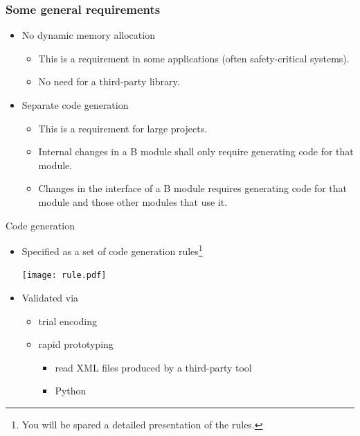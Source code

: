 \documentclass[12pt]{beamer}
\begin{document}
\begin{frame}

  \frametitle{Some general requirements}
	
  \begin{itemize}
  \item No dynamic memory allocation
    \begin{itemize}
    \item This is a requirement in some applications (often
      safety-critical systems).
    \item No need for a third-party library.
    \end{itemize}
  \item Separate code generation
    \begin{itemize}
    \item This is a requirement for large projects.
    \item Internal changes in a B module shall only require generating code
      for that module.
    \item Changes in the interface of a B module requires generating code
      for that module and those other modules that use it.
    \end{itemize}
  \end{itemize}

\end{frame}

\begin{frame}{Code generation}

  \begin{itemize}
  \item Specified as a set of code generation rules\footnote{You will be spared a detailed presentation of the rules.}

    \texttt{[image: rule.pdf]}
  \item Validated via 
    \begin{itemize}
    \item trial encoding
    \item rapid prototyping
      \begin{itemize}
      \item read XML files produced by a third-party tool
      \item Python
      \end{itemize}
    \end{itemize}
  \end{itemize}
  

\end{frame}
\end{document}
